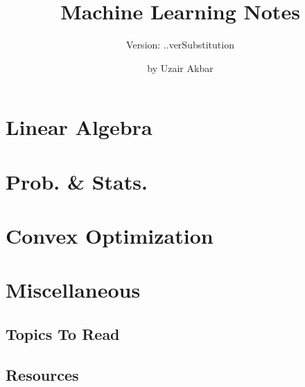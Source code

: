 \documentclass[runningheads,a4paper]{llncs}
\begin{document}
\mainmatter 

\title{Machine Learning Notes}
\subtitle{Version: \number\month .\number\year.verSubstitution}
\author{by Uzair Akbar}
\institute{}
{\def\addcontentsline#1#2#3{}\maketitle}
\medskip
\begingroup
\let\clearpage\relax
\tableofcontents
\endgroup
\medskip
\medskip

\section{Linear Algebra}

\section{Prob. \& Stats.}

\section{Convex Optimization}

\appendix
\section{Miscellaneous}
\subsection{Topics To Read}
\subsection{Resources}



\end{document}

